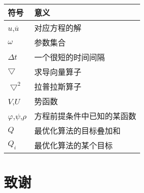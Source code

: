 \documentclass[oneside,10pt]{article}
\begin{document}
\begin{center}
\begin{tabular}{l|l}
    \hline
    符号 & 意义\\ \hline
    $u$,$\overline{u}$  & 对应方程的解\\
    $\omega$ & 参数集合\\
    $\Delta t$&一个很短的时间间隔\\
    $\bigtriangledown$&求导向量算子\\
    $\bigtriangledown^2$& 拉普拉斯算子\\
    $V$,$U$&势函数\\
    $\varphi $,$\psi $,$\rho $& 方程前提条件中已知的某函数\\
    $Q$&最优化算法的目标叠加和\\
    $Q_i$&最优化算法的某个目标\\
    \hline
\end{tabular} 
\end{center}



\titleformat{\section}{\centering\LARGE\bfseries}{}{1em}{}

\newpage
\section{致谢}


\end{document}
